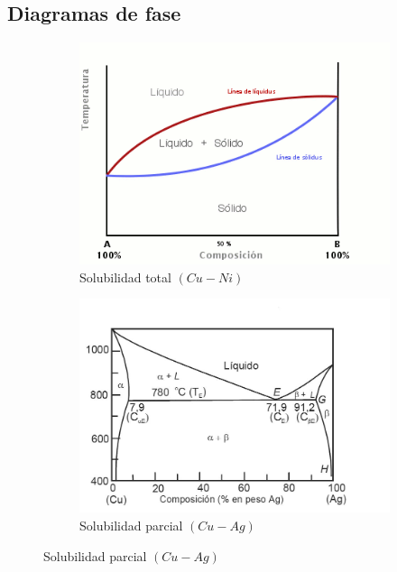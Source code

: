 \documentclass[12pt]{article}
\begin{document}
	\subsection{Diagramas de fase}
	\begin{figure}[h!]
\centering
\begin{subfigure}[b]{0.45\linewidth}
\includegraphics[width=\linewidth]{Diagrama_sol_total}
\caption{Solubilidad total $(Cu-Ni)$}
\label{fig:westminster_lateral}
\end{subfigure}
\begin{subfigure}[b]{0.45\linewidth}
\includegraphics[width=\linewidth]{diagrama_sol_parcial}
\caption{Solubilidad parcial $(Cu-Ag)$}
\label{fig:westminster_aerea}
\end{subfigure}
\label{fig:westminster}
\end{figure}
\end{document}
